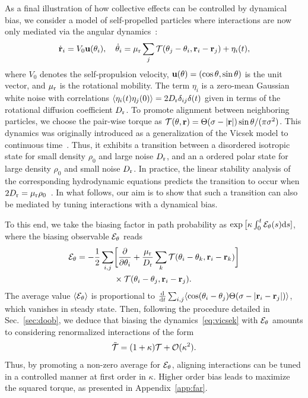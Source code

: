 \documentclass[superscriptaddress, twocolumn, prx, longbibliography, nofootinbib]{revtex4-1}
\begin{document}
As a final illustration of how collective effects can be controlled by dynamical bias, we consider a model of self-propelled particles where interactions are now only mediated via the angular dynamics~\cite{Farrell2012}:
\begin{equation}\label{eq:vicsek}
	\dot{\bf r}_i= V_0 {\bf u}(\theta_i),
	\quad
	\dot\theta_i = \mu_{\rm r} \sum_j {\cal T}(\theta_j-\theta_i, {\bf r}_i-{\bf r}_j) + \eta_i(t) ,
\end{equation}
where $V_0$ denotes the self-propulsion velocity, ${\bf u}(\theta) = (\cos\theta, \sin\theta)$ is the unit vector, and $\mu_{\rm r}$ is the rotational mobility. The term $\eta_i$ is a zero-mean Gaussian white noise with correlations $\langle\eta_i(t)\eta_j(0)\rangle = 2 D_{\rm r} \delta_{ij}\delta(t)$ given in terms of the rotational diffusion coefficient $D_{\rm r}$. To promote alignment between neighboring particles, we choose the pair-wise torque as ${\cal T}(\theta,{\bf r})=\Theta(\sigma-|{\bf r}|)\sin\theta/(\pi\sigma^2)$. This dynamics was originally introduced as a generalization of the Vicsek model to continuous time~\cite{Vicsek1995}. Thus, it exhibits a transition between a disordered isotropic state for small density $\rho_0$ and large noise $D_{\rm r}$, and an a ordered polar state for large density $\rho_0$ and small noise $D_{\rm r}$. In practice, the linear stability analysis of the corresponding hydrodynamic equations predicts the transition to occur when $2 D_{\rm r}=\mu_{\rm r}\rho_0$~\cite{Farrell2012}. In what follows, our aim is to show that such a transition can also be mediated by tuning interactions with a dynamical bias.


To this end, we take the biasing factor in path probability as $\exp\big[\kappa \int_0^t{\cal E}_\theta(s){\rm d}s]$, where the biasing observable ${\cal E}_\theta$ reads
\begin{equation}
	\begin{aligned}\label{eq:eps_theta}
		{\cal E}_\theta = - \frac{1}{2} \sum_{i,j}& \bigg[ \frac{\partial}{\partial\theta_i} + \frac{\mu_{\rm r}}{D_{\rm r}} \sum_k {\cal T}(\theta_i-\theta_k, {\bf r}_i-{\bf r}_k) \bigg]
		\\
		&\times{\cal T}(\theta_i-\theta_j, {\bf r}_i-{\bf r}_j) .
	\end{aligned}
\end{equation}
The average value $\langle{\cal E}_\theta\rangle$ is proportional to $\frac{\rm d}{{\rm d}t}\sum_{i,j}\langle\cos(\theta_i-\theta_j)\Theta(\sigma-|{\bf r}_i-{\bf r}_j|)\rangle$, which vanishes in steady state. Then, following the procedure detailed in Sec.~\ref{sec:doob}, we deduce that biasing the dynamics~\eqref{eq:vicsek} with ${\cal E}_\theta$ amounts to considering renormalized interactions of the form 
\begin{equation}\label{eq:torque}
	\tilde{\cal T} = (1+\kappa){\cal T} + {\cal O}(\kappa^2) .
\end{equation}
Thus, by promoting a non-zero average for ${\cal E}_\theta$, aligning interactions can be tuned in a controlled manner at first order in $\kappa$. Higher order bias leads to maximize the squared torque, as presented in Appendix~\ref{app:far}.
\end{document}
